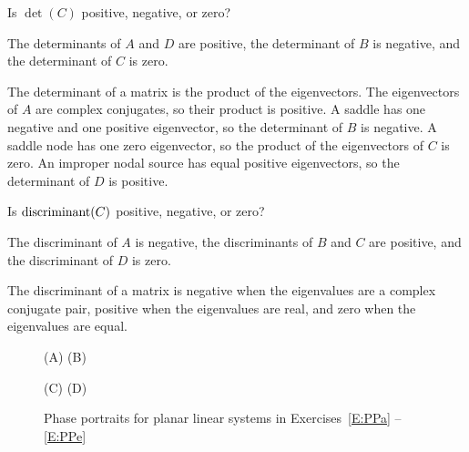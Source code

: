 \documentclass{ximera}
\begin{document}
\begin{exercise}  \label{E:PPd}
Is $\det(C)$ positive, negative, or zero?

\begin{solution}
\ans The determinants of $A$ and $D$ are positive, the
determinant of $B$ is negative, and the determinant of $C$ is zero.

\soln The determinant of a matrix is the product of the eigenvectors.  The
eigenvectors of $A$ are complex conjugates, so their product
is positive.  A saddle has one negative and one positive eigenvector, so
the determinant of $B$ is negative.  A saddle node has one zero
eigenvector, so the product of the eigenvectors of $C$ is zero.  An
improper nodal source has equal positive eigenvectors, so the determinant
of $D$ is positive.

\end{solution}
\end{exercise}
\begin{exercise}  \label{E:PPe}
Is ${\rm discriminant}(C)$ positive, negative, or zero?

\begin{solution}
\ans The discriminant of $A$ is negative, the discriminants of
$B$ and $C$ are positive, and the discriminant of $D$ is zero.

\soln The discriminant of a matrix is negative when the eigenvalues are
a complex conjugate pair, positive when the eigenvalues are real, and
zero when the eigenvalues are equal.

\end{solution}
\end{exercise}

\begin{figure*}[htb]
\centerline{(A) \hspace{2.7in} (B)}
           \centerline{%
           }
\centerline{(C) \hspace{2.7in} (D)}
           \centerline{%
           }
\caption{Phase portraits for planar linear systems in
Exercises~\protect\ref{E:PPa} -- \protect\ref{E:PPe}}
\label{F:PP}
\end{figure*}
\end{document}
